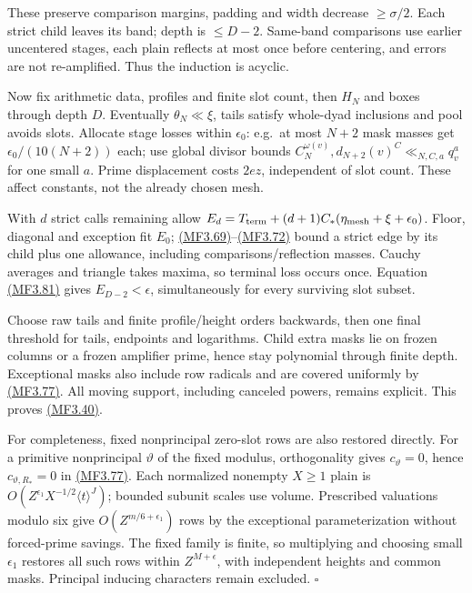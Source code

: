 These preserve comparison margins, padding and width decrease \(\ge\sigma/2\). Each strict child leaves its band; depth is \(\le D-2\). Same-band comparisons use earlier uncentered stages, each plain reflects at most once before centering, and errors are not re-amplified. Thus the induction is acyclic.

Now fix arithmetic data, profiles and finite slot count, then \(H_N\) and boxes through depth \(D\). Eventually \(\theta_N\ll\xi\), tails satisfy whole-dyad inclusions and pool avoids slots. Allocate stage losses within \(\epsilon_0\): e.g.~at most \(N+2\) mask masses get \(\epsilon_0/(10(N+2))\) each; use global divisor bounds \(C_N^{\omega(v)},d_{N+2}(v)^C\ll_{N,C,a}q_v^a\) for one small \(a\). Prime displacement costs \(2ez\), independent of slot count. These affect constants, not the already chosen mesh.

With \(d\) strict calls remaining allow \(E_d=T_{\rm term}+(d+1)C_*(\eta_{\rm mesh}+\xi+\epsilon_0)\). Floor, diagonal and exception fit \(E_0\); \protect\hyperlink{mf:eq:B3.69}{(MF3.69)}--\protect\hyperlink{mf:eq:B3.72}{(MF3.72)} bound a strict edge by its child plus one allowance, including comparisons/reflection masses. Cauchy averages and triangle takes maxima, so terminal loss occurs once. Equation \protect\hyperlink{mf:eq:B3.81}{(MF3.81)} gives \(E_{D-2}<\epsilon\), simultaneously for every surviving slot subset.

Choose raw tails and finite profile/height orders backwards, then one final threshold for tails, endpoints and logarithms. Child extra masks lie on frozen columns or a frozen amplifier prime, hence stay polynomial through finite depth. Exceptional masks also include row radicals and are covered uniformly by \protect\hyperlink{mf:eq:B3.77}{(MF3.77)}. All moving support, including canceled powers, remains explicit. This proves \protect\hyperlink{mf:eq:B3.40}{(MF3.40)}.

For completeness, fixed nonprincipal zero-slot rows are also restored directly. For a primitive nonprincipal \(\vartheta\) of the fixed modulus, orthogonality gives \(c_\vartheta=0\), hence \(c_{\vartheta,R_*}=0\) in \protect\hyperlink{mf:eq:B3.77}{(MF3.77)}. Each normalized nonempty \(X\ge1\) plain is \(O(Z^{\epsilon_1}X^{-1/2}\langle t\rangle^J)\); bounded subunit scales use volume. Prescribed valuations modulo six give \(O(Z^{m/6+\epsilon_1})\) rows by the exceptional parameterization without forced-prime savings. The fixed family is finite, so multiplying and choosing small \(\epsilon_1\) restores all such rows within \(Z^{M+\epsilon}\), with independent heights and common masks. Principal inducing characters remain excluded. \(\square\)

